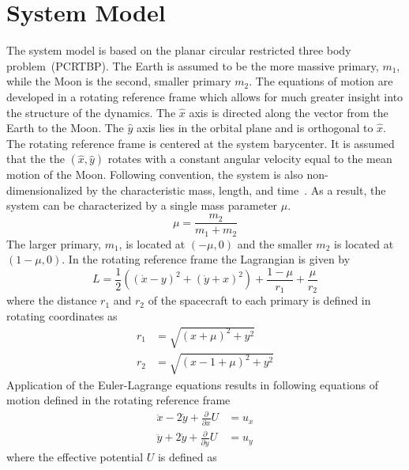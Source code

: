 \documentclass[letterpaper, preprint, paper,11pt]{AAS}	%
\begin{document}
\section{System Model}\label{sec:pcrtbp}
The system model is based on the planar circular restricted three body problem~(PCRTBP).
The Earth is assumed to be the more massive primary, \( m_1 \), while the Moon is the second, smaller primary \( m_2\).
The equations of motion are developed in a rotating reference frame which allows for much greater insight into the structure of the dynamics.
The \( \hat{x} \) axis is directed along the vector from the Earth to the Moon.
The \( \hat{y} \) axis lies in the orbital plane and is orthogonal to \( \hat{x} \).
The rotating reference frame is centered at the system barycenter.
It is assumed that the the \(\left( \hat{x}, \hat{y}\right)\) rotates with a constant angular velocity equal to the mean motion of the Moon.
Following convention, the system is also non-dimensionalized by the characteristic mass, length, and time~\cite{koon2000}.
As a result, the system can be characterized by a single mass parameter \( \mu \).
\begin{equation}
	\mu = \frac{m_2}{m_1+m_2}
	\label{eq:mass_param}
\end{equation}
The larger primary, \(m_1\), is located at \( \left(  -\mu , 0 \right)\) and the smaller \( m_2\) is located at \( \left( 1-\mu , 0 \right)\).
In the rotating reference frame the Lagrangian is given by
\begin{equation}
	L = \frac{1}{2} \left( \left( \dot{x} -y \right)^2 + \left( \dot{y} + x \right)^2 \right) + \frac{1-\mu}{r_1} + \frac{\mu}{r_2}
	\label{eq:lagrangian}
\end{equation}
where the distance \(r_1\) and \(r_2\) of the spacecraft to each primary is defined in rotating coordinates as
\begin{align}
	r_1 &= \sqrt{\left( x + \mu\right)^2 + y^2} \\
	r_2 &= \sqrt{\left( x - 1 + \mu\right)^2 + y^2}
	\label{eq:distances}
\end{align}
Application of the Euler-Lagrange equations results in following equations of motion defined in the rotating reference frame
\begin{align}
	\ddot{x} - 2 \dot{y} + \frac{\partial}{\partial x} U &= u_x \nonumber \\
	\ddot{y} + 2 \dot{y} + \frac{\partial}{\partial y} U &= u_y 
	\label{eq:cont_eom}
\end{align}
where the effective potential \( U\) is defined as
\end{document}
